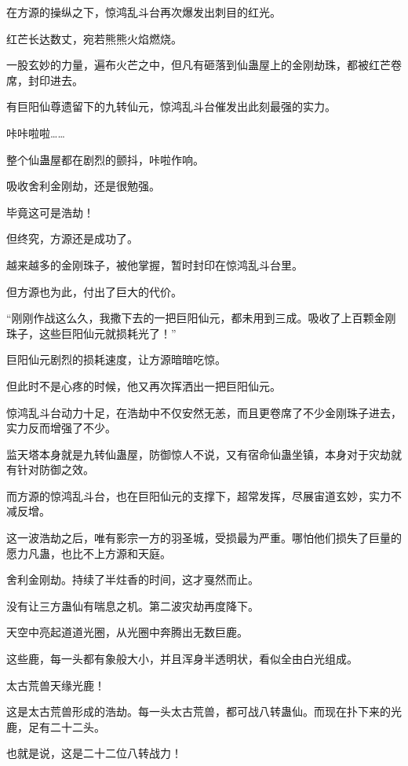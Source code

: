 
\begin{this_body}

在方源的操纵之下，惊鸿乱斗台再次爆发出刺目的红光。

红芒长达数丈，宛若熊熊火焰燃烧。

一股玄妙的力量，遍布火芒之中，但凡有砸落到仙蛊屋上的金刚劫珠，都被红芒卷席，封印进去。

有巨阳仙尊遗留下的九转仙元，惊鸿乱斗台催发出此刻最强的实力。

咔咔啦啦……

整个仙蛊屋都在剧烈的颤抖，咔啦作响。

吸收舍利金刚劫，还是很勉强。

毕竟这可是浩劫！

但终究，方源还是成功了。

越来越多的金刚珠子，被他掌握，暂时封印在惊鸿乱斗台里。

但方源也为此，付出了巨大的代价。

“刚刚作战这么久，我撒下去的一把巨阳仙元，都未用到三成。吸收了上百颗金刚珠子，这些巨阳仙元就损耗光了！”

巨阳仙元剧烈的损耗速度，让方源暗暗吃惊。

但此时不是心疼的时候，他又再次挥洒出一把巨阳仙元。

惊鸿乱斗台动力十足，在浩劫中不仅安然无恙，而且更卷席了不少金刚珠子进去，实力反而增强了不少。

监天塔本身就是九转仙蛊屋，防御惊人不说，又有宿命仙蛊坐镇，本身对于灾劫就有针对防御之效。

而方源的惊鸿乱斗台，也在巨阳仙元的支撑下，超常发挥，尽展宙道玄妙，实力不减反增。

这一波浩劫之后，唯有影宗一方的羽圣城，受损最为严重。哪怕他们损失了巨量的愿力凡蛊，也比不上方源和天庭。

舍利金刚劫。持续了半炷香的时间，这才戛然而止。

没有让三方蛊仙有喘息之机。第二波灾劫再度降下。

天空中亮起道道光圈，从光圈中奔腾出无数巨鹿。

这些鹿，每一头都有象般大小，并且浑身半透明状，看似全由白光组成。

太古荒兽天缘光鹿！

这是太古荒兽形成的浩劫。每一头太古荒兽，都可战八转蛊仙。而现在扑下来的光鹿，足有二十二头。

也就是说，这是二十二位八转战力！


\end{this_body}
